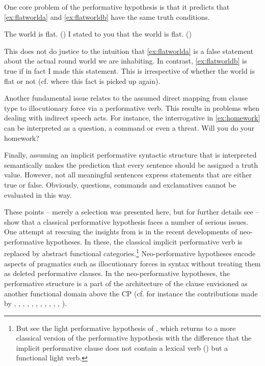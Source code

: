 One core problem of the performative hypothesis is that it predicts that \eqref{ex:flatworlda} and
\eqref{ex:flatworldb} have the same truth conditions.

\ea
\ea \label{ex:flatworlda} The world is flat. (\citealt[252: ex 42]{Levinson1983})
	\ex \label{ex:flatworldb}  I stated to you that the world is flat. (\citealt[252: ex 43]{Levinson1983})
	\z
\z

This does not do justice to the intuition that \eqref{ex:flatworlda} is a false statement about the
actual round world we are inhabiting. In contrast, \eqref{ex:flatworldb} is true if in fact I made this
 statement. This is irrespective of whether the world is flat or not (cf.  where
this fact is picked up again).

Another fundamental issue relates to the assumed direct mapping from clause type
to illocutionary force via a performative verb. This results in problems when dealing with indirect speech acts. For
instance, the interrogative in \eqref{ex:homework} can be interpreted as a question, a command or
even a threat. 
\ea\label{ex:homework} Will you do your homework?
\z

Finally, assuming an implicit performative syntactic structure that is interpreted semantically makes the prediction that every sentence should be assigned a truth value.
However, not all meaningful sentences express statements that are either true or false. Obviously, questions, commands and exclamatives cannot be evaluated
in this way.

These points -- merely a selection was presented here, but for further details see \citet{Levinson1983} -- show that a classical performative hypothesis faces a number of serious issues. One attempt at rescuing the insights from \citet{Ross1970} is in the
recent developments of neo-performative hypotheses. In these, the classical implicit
performative verb is replaced by abstract functional categories.\footnote{But see the light performative hypothesis of \citet{Alcazar2014}, which returns to a more
	classical version of the performative hypothesis with the difference that the implicit performative clause
	does not contain a lexical verb (\citealt{Ross1970})  but a functional light verb.}
Neo-performative
 hypotheses  encode aspects of pragmatics such as illocutionary forces in syntax without treating them as deleted performative clauses. In the neo-performative hypotheses, the performative structure is a part of the  architecture of the
clause envisioned as another functional domain above the CP (cf. for instance the contributions made by \citealt{Beninca2001}, \citealt{Garzonio2004},  \citealt{Hill2006, Hill2007a, Hill2007b}, \citealt{SpeasTenny2003}, \citealt{Speas2004}, \citealt{Tenny2006}, \citealt{Poletto2003}, \citealt{Zanuttini2008}, \citealt{Zanuttini2012}, \citealt{Krifka2013}, \citealt{Haegeman2014}, \citealt{Wiltschko2014}).  

